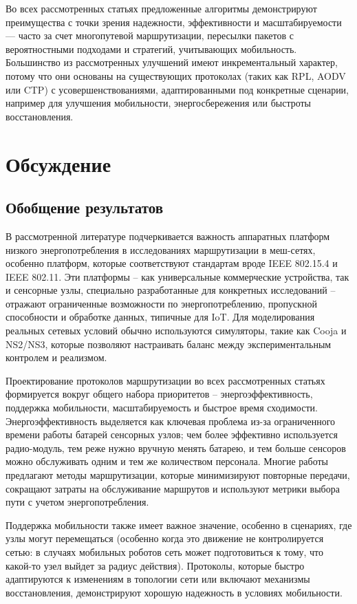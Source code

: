 \documentclass[%
]{report}
\begin{document}
Во всех рассмотренных статьях предложенные
алгоритмы демонстрируют
преимущества с точки зрения надежности,
эффективности и масштабируемости ---
часто за счет многопутевой маршрутизации,
пересылки пакетов с вероятностными подходами
и стратегий, учитывающих мобильность.
Большинство из
рассмотренных улучшений имеют инкрементальный характер,
потому что они основаны на существующих протоколах
(таких как RPL, AODV или CTP)
с усовершенствованиями, адаптированными под конкретные сценарии,
например для улучшения мобильности,
энергосбережения или быстроты восстановления.

\section{Обсуждение}\label{discussion}

\subsection{Обобщение результатов}\label{summary-of-evidence}

В рассмотренной литературе подчеркивается важность
аппаратных платформ низкого энергопотребления в
исследованиях маршрутизации в меш-сетях,
особенно платформ, которые соответствуют стандартам вроде
IEEE 802.15.4 и IEEE 802.11.
Эти платформы -- как универсальные коммерческие устройства,
так и сенсорные узлы, специально разработанные для конкретных исследований --
отражают ограниченные возможности по энергопотреблению,
пропускной способности и обработке данных,
типичные для IoT.
Для моделирования реальных сетевых условий обычно
используются симуляторы,
такие как Cooja и NS2/NS3, которые позволяют настраивать
баланс между экспериментальным контролем и реализмом.

Проектирование протоколов маршрутизации
во всех рассмотренных статьях формируется
вокруг общего набора приоритетов --
энергоэффективность, поддержка мобильности,
масштабируемость и быстрое время сходимости.
Энергоэффективность выделяется как ключевая проблема
из-за ограниченного времени работы батарей
сенсорных узлов; чем более эффективно используется радио-модуль,
тем реже нужно вручную менять батарею,
и тем больше сенсоров можно обслуживать одним и тем же количеством персонала.
Многие работы предлагают
методы маршрутизации, которые минимизируют
повторные передачи, сокращают затраты на
обслуживание маршрутов и используют метрики выбора
пути с учетом энергопотребления.

Поддержка мобильности также имеет важное значение,
особенно в сценариях, где узлы могут перемещаться 
(особенно когда это движение не контролируется сетью:
в случаях мобильных роботов сеть может подготовиться к тому,
что какой-то узел выйдет за радиус действия).
Протоколы, которые быстро адаптируются к изменениям в
топологии сети или включают механизмы восстановления,
демонстрируют хорошую надежность в условиях мобильности.
\end{document}

